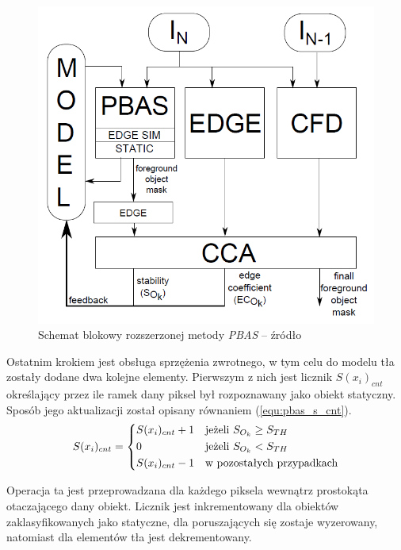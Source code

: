  
	\begin{figure}[h]
		\centering
		\includegraphics[scale=0.6]{img/3/pbas_diagram.png}
		\caption{Schemat blokowy rozszerzonej metody \textit{PBAS} -- źródło \cite{kryjak_14_pbas}}
		\label{fig:pbas_diagram}
	\end{figure}


Ostatnim krokiem jest obsługa sprzężenia zwrotnego, w tym celu do modelu tła zostały dodane dwa kolejne elementy. 
Pierwszym z nich jest licznik $S(x_i)_{cnt}$ określający przez ile ramek dany piksel był rozpoznawany jako obiekt statyczny. 
Sposób jego aktualizacji został opisany równaniem (\ref{equ:pbas_s_cnt}). 
    \begin{equation}
	    S(x_i)_{cnt} = 
		\begin{dcases}
    		S(x_i)_{cnt} + 1 & \text{jeżeli } S_{O_k} \geq  S_{TH}	 \\
            0                & \text{jeżeli } S_{O_k} <  S_{TH}	     \\		
    		S(x_i)_{cnt} - 1 & \text{w pozostałych przypadkach} 
		\end{dcases}
	\label{equ:pbas_s_cnt}	
	\end{equation}

\noindent Operacja ta jest przeprowadzana dla każdego piksela wewnątrz prostokąta otaczającego dany obiekt. Licznik jest inkrementowany dla obiektów zaklasyfikowanych jako statyczne, dla poruszających się zostaje wyzerowany, natomiast dla elementów tła jest dekrementowany.

